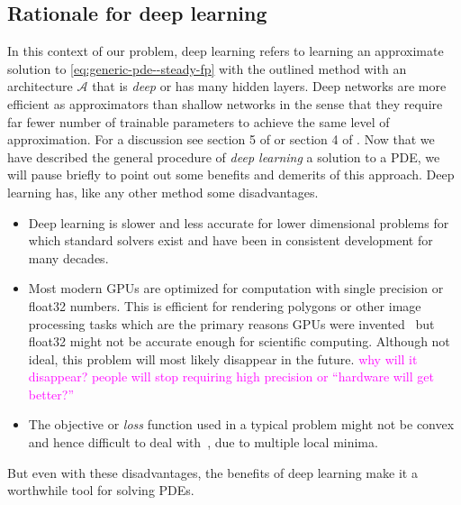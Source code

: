 \subsection{Rationale for deep learning}
In this context of our problem, deep learning refers to learning an approximate solution to \eqref{eq:generic-pde--steady-fp} with the outlined method with an architecture $\mathcal A$ that is \textit{deep} or has many hidden layers. Deep networks are more efficient as approximators than shallow networks in the sense that they require far fewer number of trainable parameters to achieve the same level of approximation. For a discussion see section 5 of \cite{holstermann2023expressive} or section 4 of \cite{lu2017expressive}. Now that we have described the general procedure of \textit{deep learning} a solution to a PDE, we will pause briefly to point out some benefits and demerits of this approach. Deep learning has, like any other method some disadvantages. 
\begin{itemize}
    \item Deep learning is slower and less accurate for lower dimensional problems for which standard solvers exist and have been in consistent development for many decades. 
    \item Most modern GPUs are optimized for computation with single precision or float32 numbers. This is efficient for rendering polygons or other image processing tasks which are the primary reasons GPUs were invented~\cite{peddie2023history} but float32 might not be accurate enough for scientific computing. Although not ideal, this problem will most likely disappear in the future. \textcolor{magenta}{why will it disappear? people will stop requiring high precision or ``hardware will get better?''}
    \item The objective or \textit{loss} function used in a typical problem might not be convex and hence difficult to deal with~\cite{krishnapriyan2021characterizing, basir2022investigating}, due to multiple local minima. 
\end{itemize}
But even with these disadvantages, the benefits of deep learning make it a worthwhile tool for solving PDEs.
